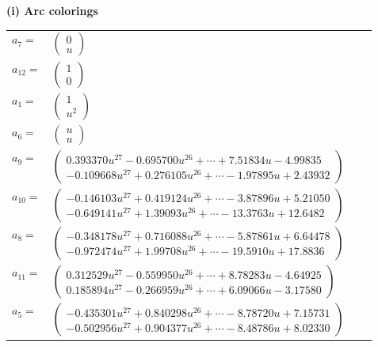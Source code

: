 \documentclass[1p]{elsarticle_modified}
\theoremstyle{definition}
\begin{document}
\flushleft \textbf{(i) Arc colorings}\\
\begin{tabular}{m{7pt} m{180pt} m{7pt} m{180pt} }
\flushright $a_{7}=$&$\begin{pmatrix}0\\u\end{pmatrix}$ \\
\flushright $a_{12}=$&$\begin{pmatrix}1\\0\end{pmatrix}$ \\
\flushright $a_{1}=$&$\begin{pmatrix}1\\u^2\end{pmatrix}$ \\
\flushright $a_{6}=$&$\begin{pmatrix}u\\u\end{pmatrix}$ \\
\flushright $a_{9}=$&$\begin{pmatrix}0.393370 u^{27}-0.695700 u^{26}+\cdots+7.51834 u-4.99835\\-0.109668 u^{27}+0.276105 u^{26}+\cdots-1.97895 u+2.43932\end{pmatrix}$ \\
\flushright $a_{10}=$&$\begin{pmatrix}-0.146103 u^{27}+0.419124 u^{26}+\cdots-3.87896 u+5.21050\\-0.649141 u^{27}+1.39093 u^{26}+\cdots-13.3763 u+12.6482\end{pmatrix}$ \\
\flushright $a_{8}=$&$\begin{pmatrix}-0.348178 u^{27}+0.716088 u^{26}+\cdots-5.87861 u+6.64478\\-0.972474 u^{27}+1.99708 u^{26}+\cdots-19.5910 u+17.8836\end{pmatrix}$ \\
\flushright $a_{11}=$&$\begin{pmatrix}0.312529 u^{27}-0.559950 u^{26}+\cdots+8.78283 u-4.64925\\0.185894 u^{27}-0.266959 u^{26}+\cdots+6.09066 u-3.17580\end{pmatrix}$ \\
\flushright $a_{5}=$&$\begin{pmatrix}-0.435301 u^{27}+0.840298 u^{26}+\cdots-8.78720 u+7.15731\\-0.502956 u^{27}+0.904377 u^{26}+\cdots-8.48786 u+8.02330\end{pmatrix}$ \\

\end{tabular}
\end{document}
